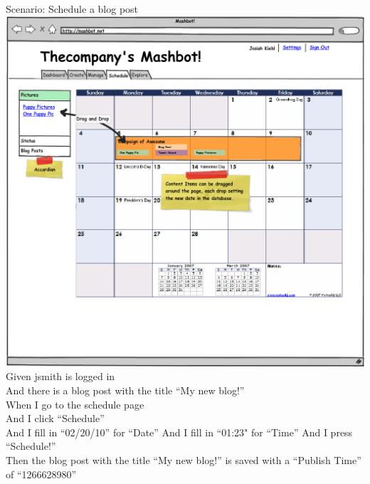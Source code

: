 \documentclass[12pt]{article}
\begin{document}
\begin{hangparas}{0.25in}{1}
  Scenario: Schedule a blog post \\
\includegraphics[width=\textwidth]{../mockups/schedule-content.png}
    Given jsmith is logged in \\
    And there is a blog post with the title ``My new blog!'' \\
    When I go to the schedule page \\
    And I click ``Schedule'' \\
    And I fill in ``02/20/10'' for ``Date''
    And I fill in ``01:23" for ``Time''
    And I press ``Schedule!'' \\
    Then the blog post with the title ``My new blog!'' is saved with a ``Publish Time'' of ``1266628980'' \\
\end{hangparas}
\end{document}
